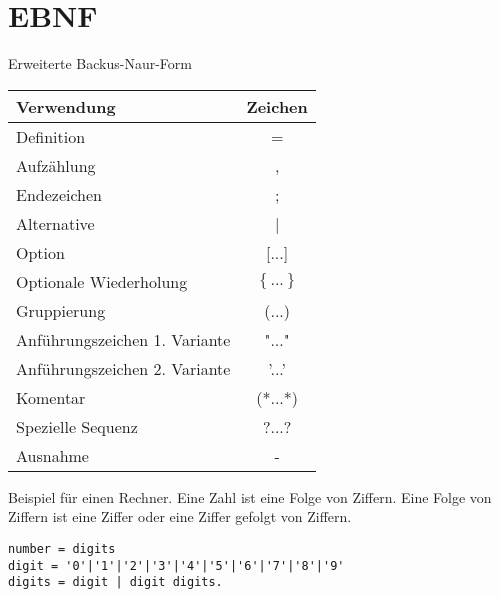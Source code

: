 \section{EBNF}
Erweiterte Backus-Naur-Form 
\begin{center}
\begin{tabularx}{\columnwidth}{|X|c|}
		\hline
\textbf{Verwendung} & \textbf{Zeichen} \\
\hline
Definition & =\\\hline
Aufzählung & ,\\\hline
Endezeichen & ;\\\hline
Alternative & |\\\hline
Option & [...]\\\hline
Optionale Wiederholung & $\left\lbrace ...\right\rbrace $ \\\hline
Gruppierung & (...)\\\hline
Anführungszeichen 1. Variante & "..."\\\hline
Anführungszeichen 2. Variante & '...'\\\hline
Komentar & (*...*)\\\hline
Spezielle Sequenz & ?...?\\\hline
Ausnahme & -\\
\hline
\end{tabularx}
\end{center}
Beispiel für einen Rechner.
Eine Zahl ist eine Folge von Ziffern. Eine Folge von Ziffern ist eine Ziffer oder eine Ziffer gefolgt von Ziffern.
\begin{lstlisting}[mathescape]
number = digits
digit = '0'|'1'|'2'|'3'|'4'|'5'|'6'|'7'|'8'|'9'
digits = digit | digit digits.

\end{lstlisting}
